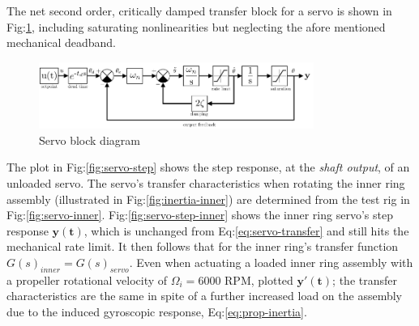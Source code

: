 \par
The net second order, critically damped transfer block for a servo is shown in Fig:\ref{fig:servo-block}, including saturating nonlinearities but neglecting the afore mentioned mechanical deadband.
\begin{figure}[hbtp]
\centering
\includegraphics[width=0.8\textwidth]{figs/servo-block}
\vspace{-5pt}
\caption{Servo block diagram}
\label{fig:servo-block}
\vspace{-15pt}
\end{figure}
\par
The plot in Fig:\ref{fig:servo-step} shows the step response, at the \emph{shaft output}, of an unloaded servo. The servo's transfer characteristics when rotating the inner ring assembly (illustrated in Fig:\ref{fig:inertia-inner}) are determined from the test rig in Fig:\ref{fig:servo-inner}. Fig:\ref{fig:servo-step-inner} shows the inner ring servo's step response {\color{Blue}$\mathbf{y(t)}$}, which is unchanged from Eq:\ref{eq:servo-transfer} and still hits the mechanical rate limit. It then follows that for the inner ring's transfer function $G(s)_{inner}=G(s)_{servo}$. Even when actuating a loaded inner ring assembly with a propeller rotational velocity of $\Omega_i=6000$ RPM, plotted {\color{Red}$\mathbf{y'(t)}$}; the transfer characteristics are the same in spite of a further increased load on the assembly due to the induced gyroscopic response, Eq:\ref{eq:prop-inertia}.
